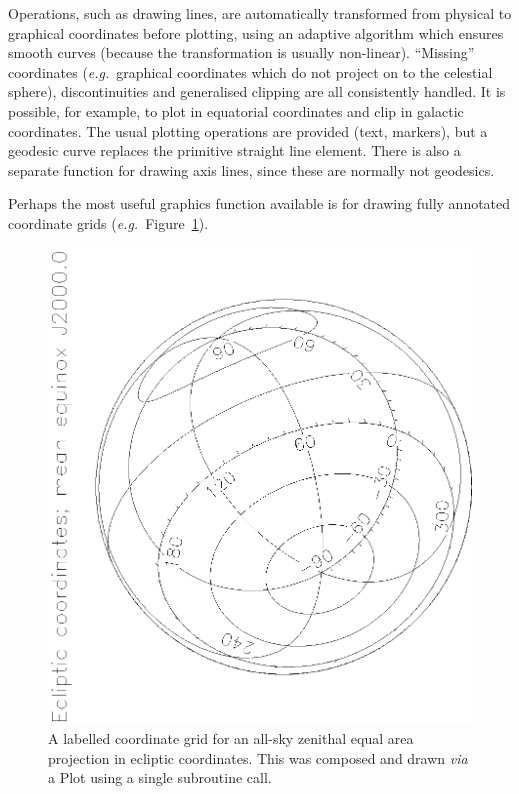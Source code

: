 \documentclass[twoside,11pt]{article}
\newenvironment{latexonly}{}{}
\begin{document}
Operations, such as drawing lines, are automatically transformed from
physical to graphical coordinates before plotting, using an adaptive
algorithm which ensures smooth curves (because the transformation is
usually non-linear).  ``Missing'' coordinates ({\em{e.g.}}\ graphical
coordinates which do not project on to the celestial sphere),
discontinuities and generalised clipping are all consistently handled.
It is possible, for example, to plot in equatorial coordinates and
clip in galactic coordinates.  The usual plotting operations are
provided (text, markers), but a geodesic curve replaces the primitive
straight line element.  There is also a separate function for drawing
axis lines, since these are normally not geodesics.

\begin{latexonly}
   Perhaps the most useful graphics function available is for drawing
   fully annotated coordinate grids ({\em{e.g.}}\ Figure~\ref{fig:gridplot}).
   \begin{figure}
   \begin{center}
   \includegraphics[scale=0.8,angle=-90]{sun210_figures/gridplot_bw.eps}
   \caption{A labelled coordinate grid for an all-sky zenithal equal area
   projection in ecliptic coordinates. This was composed and drawn
   {\em{via}} a Plot using a
   single subroutine call.}
   \label{fig:gridplot}
   \end{center}
   \end{figure}
\end{latexonly}
\end{document}
